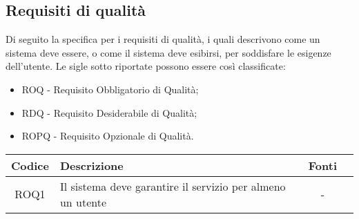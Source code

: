 \documentclass[10pt, a4paper]{article}
\begin{document}
\subsection{Requisiti di qualità}
Di seguito la specifica per i requisiti di qualità, i quali descrivono come un sistema deve essere, o
come il sistema deve esibirsi, per soddisfare le esigenze dell'utente.
Le sigle sotto riportate possono essere così classificate:
\begin{itemize}
    \item ROQ - Requisito Obbligatorio di Qualità;
    \item RDQ - Requisito Desiderabile di Qualità;
    \item ROPQ - Requisito Opzionale di Qualità.
\end{itemize}
\renewcommand{\arraystretch}{1.5}
\begin{tabularx}{\textwidth}{|c|X|c|c}\hline
\textbf{Codice} & \textbf{Descrizione}  & \textbf{Fonti} \\
\hline
ROQ1 & Il sistema deve garantire il servizio per almeno un utente & - \\
\hline
\end{tabularx}
\end{document}
